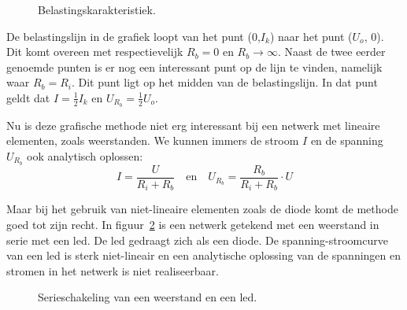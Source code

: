 \begin{figure}[!ht]
\centering
{}
\caption{Belastingskarakteristiek.}
\label{fig:gelbelastingskarakteristiek}
\end{figure}

De belastingslijn in de grafiek loopt van het punt (0,$I_k$) naar het punt ($U_o$, 0). Dit komt overeen
met respectievelijk $R_b=0$ en $R_b\rightarrow\infty$.
Naast de twee eerder genoemde punten is er nog een interessant punt op de lijn te vinden, namelijk
waar $R_b=R_i$. Dit punt ligt op het midden van de belastingslijn. In dat punt geldt dat $I=\frac{1}{2}I_k$
en $U_{R_b}=\frac{1}{2}U_o$.

Nu is deze grafische methode niet erg interessant bij een netwerk met lineaire elementen, zoals weerstanden.
We kunnen immers de stroom $I$ en de spanning $U_{R_b}$ ook analytisch oplossen:
%
\begin{equation}
I = \dfrac{U}{R_i+R_b} \quad \text{en} \quad U_{R_b} = \dfrac{R_b}{R_i+R_b}\cdot U
\end{equation}


Maar bij het gebruik van niet-lineaire elementen zoals de diode komt de methode goed tot zijn recht.
In figuur~\ref{fig:gelserieweerstandenled} is een netwerk getekend met een weerstand in serie met een
led. De led gedraagt zich als een diode. De spanning-stroomcurve van een led is sterk niet-lineair en een
analytische oplossing van de spanningen en stromen in het netwerk is niet realiseerbaar.

\begin{figure}[!ht]
\centering
{}
\caption{Serieschakeling van een weerstand en een led.}
\label{fig:gelserieweerstandenled}
\end{figure}

